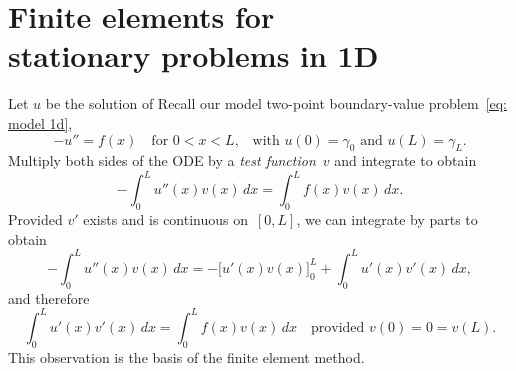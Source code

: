 \chapter[Finite elements in 1D]{Finite elements for \\
stationary problems in 1D}

Let $u$ be the solution of 
Recall our model two-point boundary-value problem~\ref{eq: model 1d}, 
\begin{equation}\label{eq: model 1d chap 2}
-u''=f(x)\quad\text{for $0<x<L$,}
	\quad\text{with $u(0)=\gamma_0$ and $u(L)=\gamma_L$.}
\end{equation}
Multiply both sides of the ODE by a \emph{test function}~$v$ and integrate to 
obtain
\[
-\int_0^L u''(x)v(x)\,dx=\int_0^L f(x)v(x)\,dx.
\]
Provided $v'$ exists and is continuous on~$[0,L]$, we can integrate by parts to 
obtain
\begin{equation}\label{eq: int by parts}
-\int_0^L u''(x)v(x)\,dx=-\bigl[u'(x)v(x)\bigr]_0^L+\int_0^Lu'(x)v'(x)\,dx,
\end{equation}
and therefore
\begin{equation}\label{eq: model 1d weak}
\int_0^L u'(x)v'(x)\,dx=\int_0^L f(x)v(x)\,dx
	\quad\text{provided $v(0)=0=v(L)$.}
\end{equation}
This observation is the basis of the finite element method.

